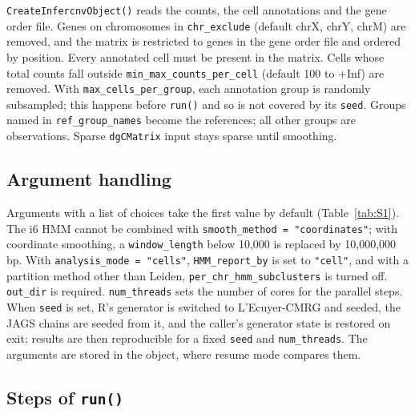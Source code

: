 \texttt{CreateInfercnvObject()} reads the counts, the cell annotations and the gene order file. Genes on chromosomes in \texttt{chr\_exclude} (default chrX, chrY, chrM) are removed, and the matrix is restricted to genes in the gene order file and ordered by position. Every annotated cell must be present in the matrix. Cells whose total counts fall outside \texttt{min\_max\_counts\_per\_cell} (default 100 to +Inf) are removed. With \texttt{max\_cells\_per\_group}, each annotation group is randomly subsampled; this happens before \texttt{run()} and so is not covered by its \texttt{seed}. Groups named in \texttt{ref\_group\_names} become the references; all other groups are observations. Sparse \texttt{dgCMatrix} input stays sparse until smoothing.

\subsection*{Argument handling}

Arguments with a list of choices take the first value by default (Table~\ref{tab:S1}). The i6 HMM cannot be combined with \texttt{smooth\_method\ =\ "coordinates"}; with coordinate smoothing, a \texttt{window\_length} below 10,000 is replaced by 10,000,000 bp. With \texttt{analysis\_mode\ =\ "cells"}, \texttt{HMM\_report\_by} is set to \texttt{"cell"}, and with a partition method other than Leiden, \texttt{per\_chr\_hmm\_subclusters} is turned off. \texttt{out\_dir} is required. \texttt{num\_threads} sets the number of cores for the parallel steps. When \texttt{seed} is set, R's generator is switched to L'Ecuyer-CMRG and seeded, the JAGS chains are seeded from it, and the caller's generator state is restored on exit; results are then reproducible for a fixed \texttt{seed} and \texttt{num\_threads}. The arguments are stored in the object, where resume mode compares them.

\subsection*{Steps of \texttt{run()}}

